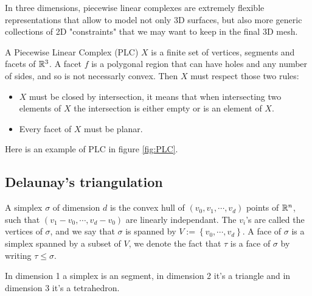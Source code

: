 \documentclass[11pt]{article}
\begin{document}
In three dimensions, piecewise linear complexes are extremely flexible representations that allow to model not only 3D surfaces, but also more generic collections of 2D "constraints" that we may want to keep in the final 3D mesh.

\begin{definition}

	A Piecewise Linear Complex (PLC) $X$ is a finite set of vertices, segments and facets of $\mathbb{R}^3$. A facet
	$f$ is a polygonal region that can have holes and any number of sides, and so is not necessarly convex.
	Then $X$ must respect those two rules:

	\begin{itemize}

		\item $X$ must be closed by intersection, it means that when intersecting two elements of $X$ the
		      intersection is either empty or is an element of $X$.

		\item Every facet of $X$ must be planar.

	\end{itemize}

\end{definition}

Here is an example of PLC in figure \ref{fig:PLC}.



\subsection{Delaunay's triangulation}

\begin{definition}[Simplex]

	A simplex $\sigma$ of dimension $d$ is the convex hull of $\left(v_0, v_1, \cdots, v_d\right)$ points of
	$\mathbb{R}^{n}$, such that $(v_1 - v_0, \cdots, v_d - v_0)$ are linearly independant. The $v_{i}$'s are called
	the vertices of $\sigma$, and we say that $\sigma$ is spanned by $V := \left\{v_0, \cdots, v_d \right\}$.
	A face of $\sigma$ is a simplex spanned by a subset of $V$, we denote the fact that $\tau$ is a face of
	$\sigma$ by writing $\tau\leq\sigma$.

\end{definition}

\begin{remark}

	In dimension 1 a simplex is an segment, in dimension 2 it's a triangle and in dimension 3 it's a tetrahedron.

\end{remark}
\end{document}
